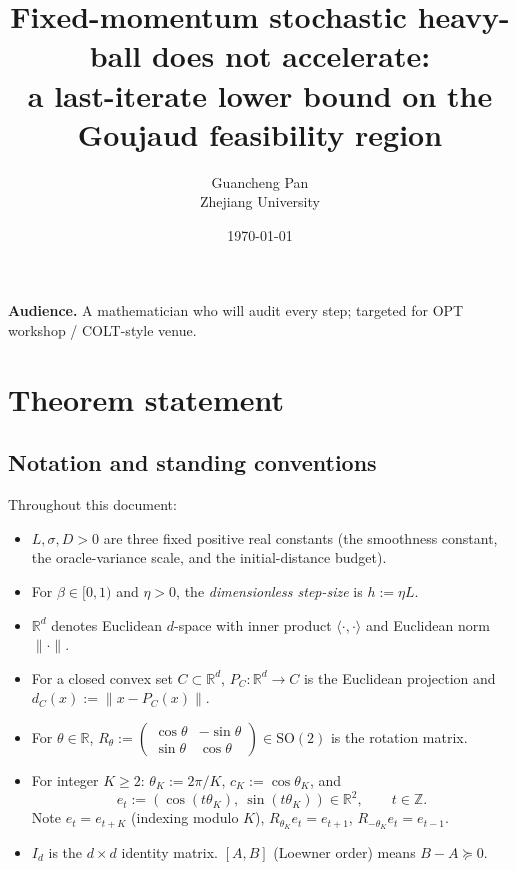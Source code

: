 \documentclass[11pt]{article}
\title{Fixed-momentum stochastic heavy-ball does not accelerate:\\
       a last-iterate lower bound on the Goujaud feasibility region}
\author{Guancheng Pan\\Zhejiang University}
\date{\today}
\theoremstyle{definition}
\theoremstyle{remark}
\begin{document}
\maketitle
\tableofcontents

\bigskip

\noindent\textbf{Audience.} A mathematician who will audit every step; targeted for OPT workshop / COLT-style venue.

\bigskip

\section{Theorem statement}

\subsection{Notation and standing conventions}

Throughout this document:

\begin{itemize}
\item $L, \sigma, D > 0$ are three fixed positive real constants (the smoothness constant, the oracle-variance scale, and the initial-distance budget).
\item For $\beta \in [0,1)$ and $\eta > 0$, the \emph{dimensionless step-size} is $h := \eta L$.
\item $\mathbb{R}^d$ denotes Euclidean $d$-space with inner product $\langle\cdot,\cdot\rangle$ and Euclidean norm $\|\cdot\|$.
\item For a closed convex set $C \subset \mathbb{R}^d$, $P_C : \mathbb{R}^d \to C$ is the Euclidean projection and $d_C(x) := \|x - P_C(x)\|$.
\item For $\theta \in \mathbb{R}$, $R_\theta := \begin{pmatrix}\cos\theta & -\sin\theta\\ \sin\theta & \cos\theta\end{pmatrix} \in \mathrm{SO}(2)$ is the rotation matrix.
\item For integer $K \geq 2$: $\theta_K := 2\pi/K$, $c_K := \cos\theta_K$, and
\[
  e_t := (\cos(t\theta_K),\ \sin(t\theta_K)) \in \mathbb{R}^2,\qquad t \in \mathbb{Z}.
\]
Note $e_t = e_{t+K}$ (indexing modulo $K$), $R_{\theta_K} e_t = e_{t+1}$, $R_{-\theta_K} e_t = e_{t-1}$.
\item $I_d$ is the $d\times d$ identity matrix. $[A, B]$ (Loewner order) means $B - A \succeq 0$.
\end{itemize}
\end{document}
